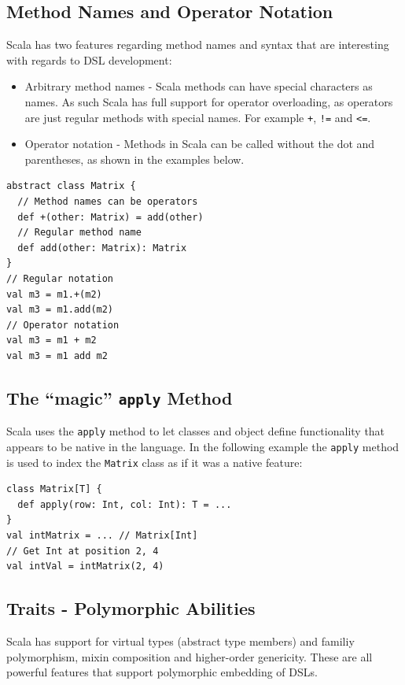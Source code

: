 \documentclass[a4paper,english]{report}
\begin{document}
\subsection{Method Names and Operator Notation}

Scala has two features regarding method names and syntax that are
interesting with regards to DSL development:

\begin{itemize}
\item Arbitrary method names - Scala methods can have special
  characters as names. As such Scala has full support for operator
  overloading, as operators are just regular methods with special
  names. For example \texttt{+}, \texttt{!=} and \texttt{<=}.
\item Operator notation - Methods in Scala can be called without the
  dot and parentheses, as shown in the examples below.
\end{itemize}

\begin{lstlisting}
abstract class Matrix {
  // Method names can be operators
  def +(other: Matrix) = add(other)
  // Regular method name
  def add(other: Matrix): Matrix
}
// Regular notation
val m3 = m1.+(m2)
val m3 = m1.add(m2)
// Operator notation
val m3 = m1 + m2
val m3 = m1 add m2
\end{lstlisting}

\subsection{The ``magic'' \texttt{apply} Method}
\label{sec:applymethod}

Scala uses the \texttt{apply} method to let classes and object define
functionality that appears to be native in the language. In the
following example the \texttt{apply} method is used to index the
\texttt{Matrix} class as if it was a native feature:

\begin{lstlisting}
class Matrix[T] {
  def apply(row: Int, col: Int): T = ...
}
val intMatrix = ... // Matrix[Int]
// Get Int at position 2, 4
val intVal = intMatrix(2, 4)
\end{lstlisting}

\subsection{Traits - Polymorphic Abilities}

Scala has support for virtual types (abstract type members) and
familiy polymorphism\cite{ode03}, mixin composition\cite{ode05} and
higher-order genericity\cite{moo08}. These are all powerful features
that support polymorphic embedding of DSLs\cite{hof08}.
\end{document}

